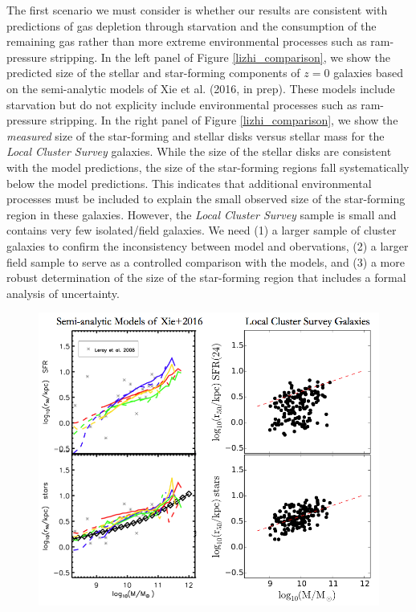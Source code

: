 \documentclass[12pt, preprint]{aastex}
\begin{document}
{The first scenario we must consider is whether our results are
consistent with predictions of gas depletion through starvation and
the consumption of the remaining gas
rather than more extreme environmental processes such as ram-pressure stripping.
In the left panel of Figure \ref{lizhi_comparison}, we show the predicted size of the
stellar and star-forming components of $z = 0$ galaxies based on the
semi-analytic models of Xie et al. (2016, in prep).  These models
include starvation but do not explicity include environmental
processes such as ram-pressure stripping.  In the right panel of
Figure \ref{lizhi_comparison}, we show the {\it measured} size of the
star-forming and stellar disks versus stellar mass for the {\it Local
  Cluster Survey} galaxies.  While the size of the stellar disks are
consistent with the model predictions, the size of the star-forming
regions fall systematically below the model predictions.  This
indicates that additional environmental processes must be included to
explain the small observed size of the star-forming region in these
galaxies.  However, the {\it Local Cluster Survey} sample is small and
contains very few isolated/field galaxies.
We need (1) a larger sample of cluster galaxies to confirm the inconsistency between model
and obervations, (2) a larger field sample to serve as a controlled
comparison with the models, and (3) a more robust determination of
the size of the star-forming region that includes a formal analysis of
uncertainty.
\begin{figure}[h!]
\begin{center}
\includegraphics[width=.85\textwidth]{lizhi_comparison.png}
\end{center}

\end{figure}}
\end{document}
